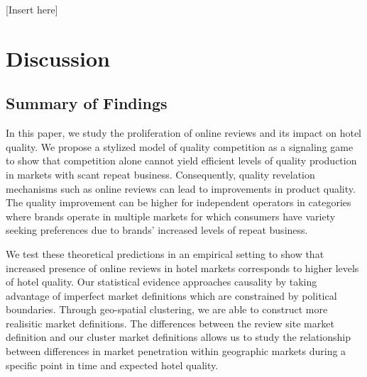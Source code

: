 \documentclass[mksc,blindrev]{informs3} %
\begin{document}
[Insert  here]







\section*{Discussion} \label{sec:discussion}

\subsection{Summary of Findings}

In this paper, we study the proliferation of online reviews and its impact on hotel quality. We propose a stylized model of quality competition as a signaling game to show that competition alone cannot yield efficient levels of quality production in markets with scant repeat business. Consequently, quality revelation mechanisms such as online reviews can lead to improvements in product quality. The quality improvement can be higher for independent operators in categories where brands operate in multiple markets for which consumers have variety seeking preferences due to brands' increased levels of repeat business. 

We test these theoretical predictions in an empirical setting to show that increased presence of online reviews in hotel markets corresponds to higher levels of hotel quality. Our statistical evidence approaches causality by taking advantage of imperfect market definitions which are constrained by political boundaries. Through geo-spatial clustering, we are able to construct more realisitic market definitions. The differences between the review site market definition and our cluster market definitions allows us to study the relationship between differences in market penetration within geographic markets during a specific point in time and expected hotel quality. 
\end{document}
